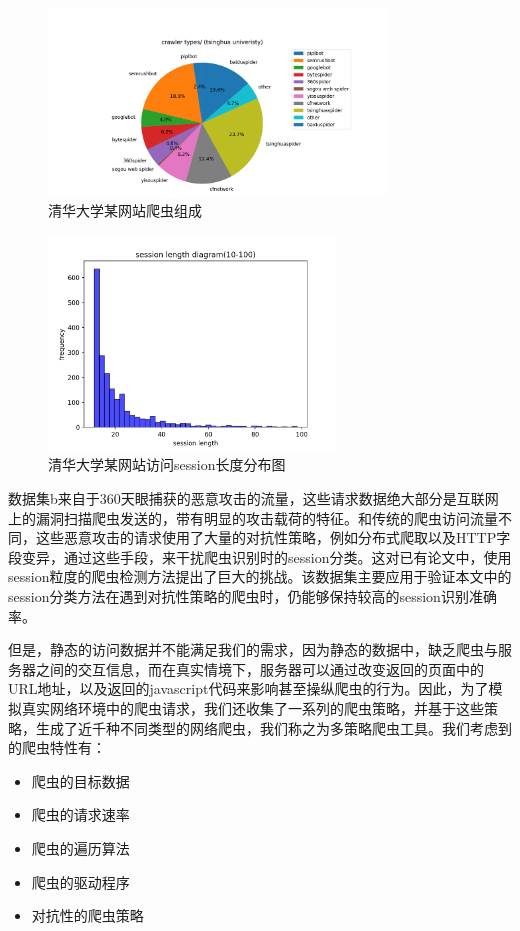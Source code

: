 \documentclass[doctor,privacy,twoside]{buaa_mac}
\begin{document}
\begin{figure}[!h]
  \centering
  \includegraphics[width=0.8\textwidth]{images/THU_crawler_types.png}
  \caption{清华大学某网站爬虫组成}
  \label{fig:crawlers}
\end{figure}

\begin{figure}[!h]
  \centering
  \includegraphics[width=0.68\textwidth]{images/session_len_10_100.png}
  \caption{清华大学某网站访问session长度分布图}
  \label{fig:session_len}
\end{figure}

数据集b来自于360天眼捕获的恶意攻击的流量，这些请求数据绝大部分是互联网上的漏洞扫描爬虫发送的，带有明显的攻击载荷的特征。和传统的爬虫访问流量不同，这些恶意攻击的请求使用了大量的对抗性策略，例如分布式爬取以及HTTP字段变异，通过这些手段，来干扰爬虫识别时的session分类。这对已有论文中，使用session粒度的爬虫检测方法提出了巨大的挑战。该数据集主要应用于验证本文中的session分类方法在遇到对抗性策略的爬虫时，仍能够保持较高的session识别准确率。

但是，静态的访问数据并不能满足我们的需求，因为静态的数据中，缺乏爬虫与服务器之间的交互信息，而在真实情境下，服务器可以通过改变返回的页面中的URL地址，以及返回的javascript代码来影响甚至操纵爬虫的行为。因此，为了模拟真实网络环境中的爬虫请求，我们还收集了一系列的爬虫策略，并基于这些策略，生成了近千种不同类型的网络爬虫，我们称之为多策略爬虫工具。我们考虑到的爬虫特性有：
\begin{itemize}
\item 爬虫的目标数据
\item 爬虫的请求速率
\item 爬虫的遍历算法
\item 爬虫的驱动程序
\item 对抗性的爬虫策略
\end{itemize}
\end{document}

